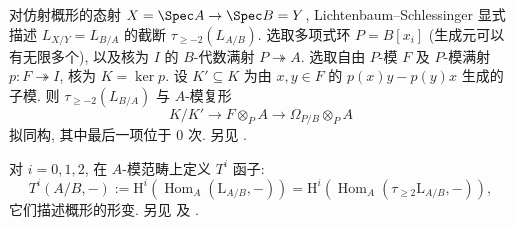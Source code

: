 对仿射概形的态射 $X=\Spec A\to\Spec B=Y$, Lichtenbaum--Schlessinger \cite{LS67} 显式描述 $L_{X/Y}=L_{B/A}$ 的截断 $\tau_{\geq-2}(L_{A/B})$. 选取多项式环 $P=B[x_i]$ (生成元可以有无限多个), 以及核为 $I$ 的 $B$-代数满射 $P\twoheadrightarrow A$. 选取自由 $P$-模 $F$ 及 $P$-模满射 $p:F\twoheadrightarrow I$, 核为 $K=\ker p$. 设 $K'\subseteq K$ 为由 $x,y\in F$ 的 $p(x)y-p(y)x$ 生成的子模. 则 $\tau_{\geq-2}(L_{B/A})$ 与 $A$-模复形
\begin{equation}\label{src:C.3.3}
K/K'\to F\otimes_PA\to\Omega_{P/B}\otimes_PA
\end{equation}
拟同构, 其中最后一项位于 $0$ 次. 另见 \cite[Tag 09CG]{SP}.

对 $i=0,1,2$, 在 $A$-模范畴上定义 $T^i$ 函子:
\[
T^i(A/B,-):=\mathrm H^i(\operatorname{Hom}_A(\mathrm L_{A/B},-))=\mathrm H^i(\operatorname{Hom}_A(\tau_{\geq2}\mathrm L_{A/B},-)),
\]
它们描述概形的形变. 另见 \cite[\S $2.3$]{LS67} 及 \cite[\S $1.3$]{Har10}.
